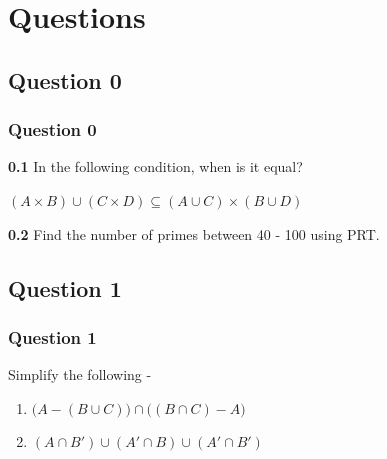 \documentclass[xcolor=svgnames]{beamer}
\begin{document}
\section{Questions}

\subsection{Question 0}
\begin{frame}
\frametitle{Question 0}
\textbf{0.1} In the following condition, when is it equal?
\begin{center}
     $(A \times B) \cup (C \times D) \subseteq (A \cup C) \times (B \cup D)$ 
\end{center}
\textbf{0.2} Find the number of primes between 40 - 100 using PRT.
\end{frame}

\subsection{Question 1}
\begin{frame}
\frametitle{Question 1}

Simplify the following - 
\begin{enumerate}
    \item $\big(A - (B \cup C)\big) \cap \big((B \cap C) - A\big)$
    \item $(A \cap B') \cup (A' \cap B) \cup (A' \cap B')$
\end{enumerate}
\end{frame}
\end{document}
